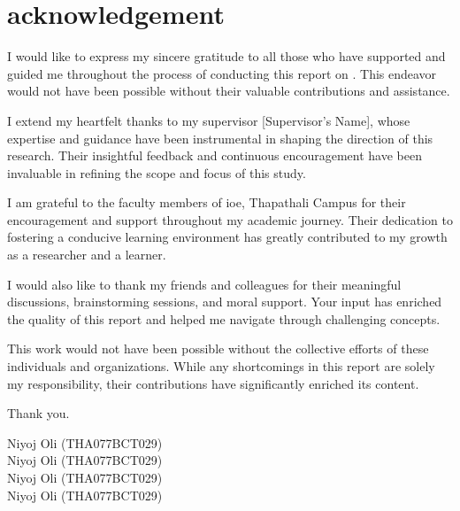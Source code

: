 \chapter*{acknowledgement}

I would like to express my sincere gratitude to all those who have supported and guided me throughout the process of conducting this report on \projectTitle. This endeavor would not have been possible without their valuable contributions and assistance.

\noindent I extend my heartfelt thanks to my supervisor [Supervisor's Name], whose expertise and guidance have been instrumental in shaping the direction of this research. Their insightful feedback and continuous encouragement have been invaluable in refining the scope and focus of this study.

\noindent I am grateful to the faculty members of \gls{ioe}, Thapathali Campus for their encouragement and support throughout my academic journey. Their dedication to fostering a conducive learning environment has greatly contributed to my growth as a researcher and a learner.

\noindent I would also like to thank my friends and colleagues for their meaningful discussions, brainstorming sessions, and moral support. Your input has enriched the quality of this report and helped me navigate through challenging concepts.

\noindent This work would not have been possible without the collective efforts of these individuals and organizations. While any shortcomings in this report are solely my responsibility, their contributions have significantly enriched its content.

\noindent Thank you.

\noindent Niyoj Oli (THA077BCT029)\\
Niyoj Oli (THA077BCT029)\\
Niyoj Oli (THA077BCT029)\\
Niyoj Oli (THA077BCT029)\\

\newpage
